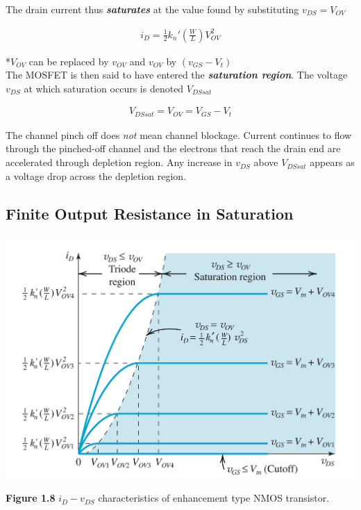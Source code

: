 \documentclass[12pt]{article}
\begin{document}
    The drain current thus \textit{\textbf{saturates}} at the value found by substituting 
    $v_{DS} = V_{OV}$

    \begin{align}
        i_D = \frac{1}{2}k_n'\left(\frac{W}{L}\right)V^2_{OV}
    \end{align}

    *$V_{OV}$ can be replaced by $v_{OV}$ and $v_{OV}$ by $(v_{GS}-V_t)$\\[\baselineskip]
    The MOSFET is then said to have entered the \textit{\textbf{saturation region}}. The voltage 
    $v_{DS}$ at which saturation occurs is denoted $V_{DSsat}$

    \begin{align}
        V_{DSsat} = V_{OV} = V_{GS} - V_t
    \end{align}

    The channel pinch off does \textit{not} mean channel blockage. Current continues to flow
    through the pinched-off channel and the electrons that reach the drain end are 
    accelerated through depletion region. Any increase in $v_{DS}$ above $V_{DSsat}$ appears as 
    a voltage drop across the depletion region.  

    \subsection*{Finite Output Resistance in Saturation}

    \begin{center}
        \centerline{\includegraphics[scale=0.5]{figures/fig14.png}}
        \textbf{Figure 1.8} $i_D-v_{DS}$ characteristics of enhancement type NMOS transistor.
    \end{center}
\end{document}

